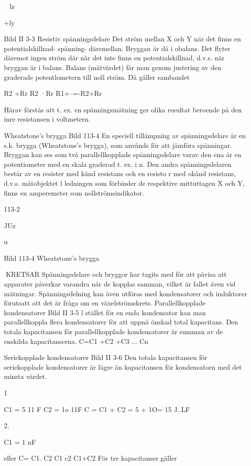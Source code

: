 \documentclass[a4paper,twoside,twocolumn,openright]{book}
\begin{document}
{{{{~ lz

+ly

Bild II 3-3 Resistiv spänningsdelare
Det
ström mellan X och Y när det
finns en potentialskillnad- spänning- däremellan. Bryggan är då i obalans.
Det flyter däremot ingen ström där när
det inte finns en potentialskillnad, d.v.s. när
bryggan är i balans. Balans (mätvärdet) får
man genom justering av den graderade
potentlometern till noll ström. Då gäller sambandet

R2 +Rr
R2 ·Rr
R1+--=-R2+Rr

Härav förstås att t. ex. en spänningsmätning ger olika resultat beroende på den inre
resistansen i voltmetern.

Wheatstone's brygga
Bild 113-4
En speciell tillämpning av spänningsdelare
är en s.k. brygga (Wheatstone's brygga),
som används för att jämföra spänningar.
Bryggan kan ses som två parallellkopplade spänningsdelare varav den ena är en
potentiometer med en skala graderad t. ex.
i n. Den andra spänningsdelaren består av
en resister med känd resistans och en resisto r med okänd resistans, d.v.s. mätobjektet
l ledningen som förbinder de respektive mittuttagen X och Y, finns en amperemeter som
nollströmsindikator.

113-2

JUz

u

Bild 113-4 Wheatstone's brygga

KRETSAR
Spänningsdelare och bryggor har tagits
med för att påvisa att apparater påverkar
varandra när de kopplas samman, vilket är
fallet även vid mätningar.
Spänningsdelning kan även utföras med
kondensatorer och induktorer förutsatt att
det är fråga om en växelströmskrets.
Parallellkopplade kondensatorer
Bild II 3-5
l stället för en enda kondensator kan man
parallellkoppla flera kondensatorer för att
uppnå önskad total kapacitans.
Den totala kapacitansen för parallellkopplade kondensatorer är summan av de
enskilda kapacitanserna.
C=C1 +C2 +C3 ... Cn

Seriekopplade kondensatorer
Bild II 3-6
Den totala kapacitansen för seriekopplade
kondensatorer är lägre än kapacitansen för
kondensatorn med det minsta värdet.

1

C1 = 5 11 F C2 = 1o 11F
C = C1 + C2 = 5 + 1O= 15 J..LF

2.

C1 = 1 nF

eller
C= C1. C2
C1 c2
C1+C2
För tre kapacitanser gäller

}}}}
\end{document}
